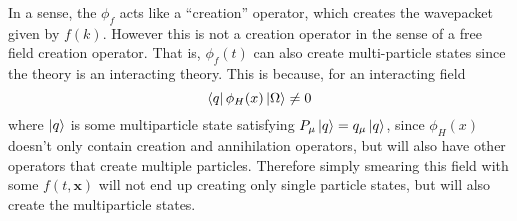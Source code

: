 \documentclass[11pt]{article}
\numberwithin{equation}{section}
\begin{document}
In a sense, the \(\phi_f\) acts like a ``creation'' operator, which creates the wavepacket given by \(f(k)\). However this is not a creation operator in the sense of a free field creation operator. That is, \(\phi_f(t)\) can also create multi-particle states since the theory is an interacting theory. This is because, for an interacting field 
\begin{equation*}
    \bra{q} \phi_H(x) \ket{\Omega} \ne 0
\end{equation*}
where \(\ket{q}\) is some multiparticle state satisfying \(P_\mu\ket{q} = q_\mu \ket{q}\), since \(\phi_H(x)\) doesn't only contain creation and annihilation operators, but will also have other operators that create multiple particles. Therefore simply smearing this field with some \(f(t, \textbf{x})\) will not end up creating only single particle states, but will also create the multiparticle states.\\
\end{document}
